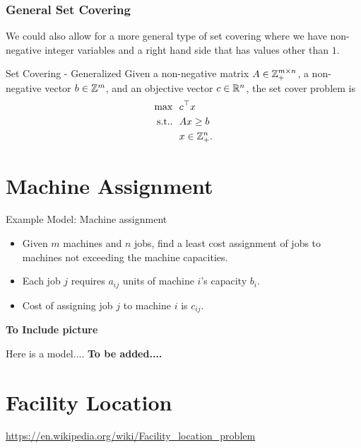\documentclass[../open-optimization/open-optimization.tex]{subfiles}
\begin{document}
\subsubsection{General Set Covering}
We could also allow for a more general type of set covering where we have non-negative integer variables and a right hand side that has values other than $1$.
\begin{general}{Set Covering - Generalized}{\npcomplete}
\label{general:set-covering-alternate}
Given a non-negative matrix $A \in {\mathbb{Z}}_+^{m \times n}$, a non-negative vector $b \in {\mathbb{Z}}^m$, and an objective vector $c \in {\mathbb{R}}^n$, the set cover problem is
\begin{equation}
\begin{split}
\max \ \ & c^\top x\\
\text{s.t.}. \ \ & Ax \geq b \\
& x \in{\mathbb{Z}}^n_+.
\end{split}
\end{equation}
\end{general}



\section{Machine Assignment}


Example Model: Machine assignment\\

\begin{minipage}{0.6\textwidth}
\begin{itemize}
	\item Given $m$ machines and $n$ jobs, find a least cost assignment
	of jobs to machines not exceeding the machine capacities.
	\item Each job $j$ requires $a_{ij}$ units of machine $i$'s capacity $b_i$.
	\item Cost of assigning job $j$ to machine $i$ is $c_{ij}$.
	\end{itemize}
\end{minipage}
\begin{minipage}{0.3\textwidth}
\textbf{To Include picture}
\end{minipage}


Here is a model....  \textbf{To be added....}

\section{Facility Location}
\url{https://en.wikipedia.org/wiki/Facility_location_problem}
\end{document}
